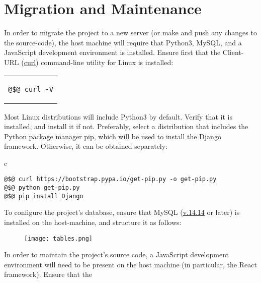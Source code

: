 \documentclass[11pt]{article}
\begin{document}
\section{Migration and Maintenance}
In order to migrate the project to a new server (or make and push any changes to the source-code),
the host machine will require that Python3, MySQL, and a JavaScript development environment is
installed. Ensure first that the Client-URL (\url{curl}) command-line utility for Linux is
installed:
\begin{center} \begin{tabular}{c} \begin{lstlisting}[linewidth=1.75cm]
@$@ curl -V
\end{lstlisting} \end{tabular} \end{center}
If not, install it using your system's appropriate package-installation tool. For Debian, Ubuntu,
or related distributions, use:
\begin{center} \begin{tabular}{c} \begin{lstlisting}[linewidth=5cm]
@$@ sudo apt-get install curl
\end{lstlisting} \end{tabular} \end{center}
Most Linux distributions will include Python3 by default. Verify that it is installed, and install
it if not. Preferably, select a distribution that includes the Python package manager pip, which
will be used to install the Django framework. Otherwise, it can be obtained separately:
\begin{center} \begin{tabular}{c} \begin{lstlisting}[linewidth=10.8cm]
@$@ curl https://bootstrap.pypa.io/get-pip.py -o get-pip.py
@$@ python get-pip.py
@$@ pip install Django
\end{lstlisting} \end{tabular} \end{center}
To configure the project's database, ensure that MySQL (\url{v.14.14} or later) is installed on the
host-machine, and structure it as follows:
\begin{figure}[H]
\texttt{[image: tables.png]}
\centering
\end{figure}
\noindent In order to maintain the project's source code, a JavaScript development environment will
need to be present on the host machine (in particular, the React framework). Ensure that the
\end{document}
